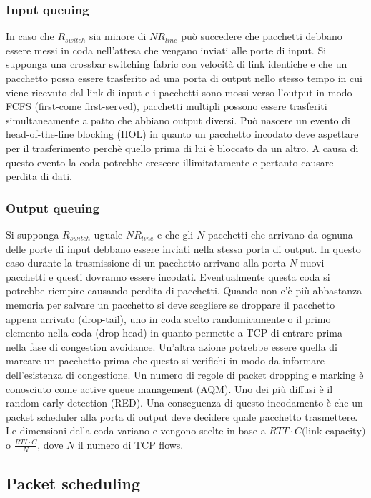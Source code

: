 \subsubsection{Input queuing}
In caso che $R_{switch}$ sia minore di $NR_{line}$ pu\`o succedere che pacchetti debbano essere messi in coda nell'attesa che vengano inviati alle porte di
input. Si supponga una crossbar switching fabric con velocit\`a di link identiche e che un pacchetto possa essere trasferito ad una porta di output nello
stesso tempo in cui viene ricevuto dal link di input e i pacchetti sono mossi verso l'output in modo FCFS (first-come first-served), pacchetti multipli 
possono essere trasferiti simultaneamente a patto che abbiano output diversi. Pu\`o nascere un evento di head-of-the-line blocking (HOL) in quanto un 
pacchetto incodato deve aspettare per il trasferimento perch\`e quello prima di lui \`e bloccato da un altro. A causa di questo evento la coda potrebbe 
crescere illimitatamente e pertanto causare perdita di dati.
\subsubsection{Output queuing}
Si supponga $R_{switch}$ uguale  $NR_{line}$ e che gli $N$ pacchetti che arrivano da ognuna delle porte di input debbano essere inviati nella stessa porta 
di output. In questo caso durante la trasmissione di un pacchetto arrivano alla porta $N$ nuovi pacchetti e questi dovranno essere incodati. Eventualmente
questa coda si potrebbe riempire causando perdita di pacchetti. Quando non c'\`e pi\`u abbastanza memoria per salvare un pacchetto si deve scegliere se 
droppare il pacchetto appena arrivato (drop-tail), uno in coda scelto randomicamente o il primo elemento nella coda (drop-head) in
quanto permette a TCP di entrare prima nella fase di congestion avoidance. Un'altra azione potrebbe essere quella di marcare un pacchetto prima che questo si 
verifichi in modo da informare dell'esistenza di congestione. Un numero di regole di packet dropping e marking \`e conosciuto come active queue management
(AQM). Uno dei pi\`u diffusi \`e il random early detection (RED). Una conseguenza di questo incodamento \`e che un packet scheduler alla porta di output 
deve decidere quale pacchetto trasmettere. Le dimensioni della coda variano e vengono scelte in base  a $RTT\cdot C\text{(link capacity)}$ o $\frac{RTI\cdot 
C}{N}$, dove $N$ il numero di TCP flows.
\subsection{Packet scheduling}
